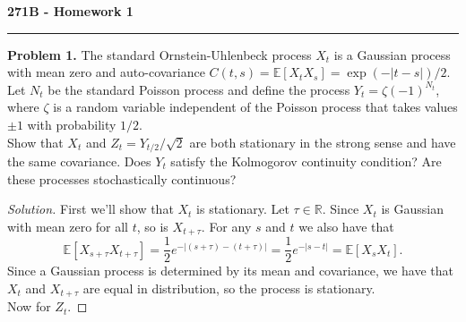 \documentclass[11pt,letterpaper]{report}
\newcommand{\reals}{\mathbb{R}}
\newcommand{\E}{\mathbb{E}}
\newenvironment{solution}
{\begin{proof}[Solution]}
{\end{proof}}
\begin{document}
\begin{center}
{\bf \Large 271B - Homework 1}
\vspace{0.2cm}
\hrule
\end{center}

\noindent\textbf{Problem 1. }The standard Ornstein-Uhlenbeck process $X_t$ is a Gaussian process with mean zero and auto-covariance $C(t, s) = \E[X_tX_s] = \exp(-|t-s|)/2$. Let $N_t$ be the standard Poisson process and define the process $Y_t = \zeta(-1)^{N_t}$, where $\zeta$ is a random variable independent of the Poisson process that takes values $\pm 1$ with probability $1/2$.\\

\noindent Show that $X_t$ and $Z_t = Y_{t/2}/\sqrt{2}$ are both stationary in the strong sense and have the same covariance. Does $Y_t$ satisfy the Kolmogorov continuity condition? Are these processes stochastically continuous?

\begin{solution}
	First we'll show that $X_t$ is stationary. Let $\tau\in \reals$. Since $X_t$ is Gaussian with mean zero for all $t$, so is $X_{t+\tau}$. For any $s$ and $t$ we also have that
	\[
	\E[X_{s+\tau}X_{t+\tau}] = \frac{1}{2}e^{-|(s+\tau)-(t+\tau)|} = \frac{1}{2}e^{-|s-t|} = \E[X_sX_t].
	\]
	Since a Gaussian process is determined by its mean and covariance, we have that $X_t$ and $X_{t+\tau}$ are equal in distribution, so the process is stationary.\\

	\noindent Now for $Z_t$. 
\end{solution}
\end{document}
